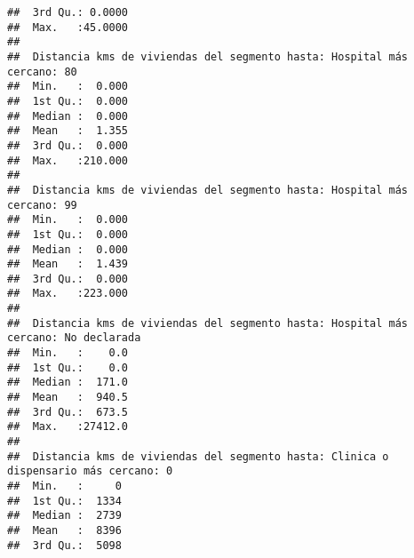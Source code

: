 \documentclass[11pt,]{article}
\begin{document}
\begin{verbatim}
##  3rd Qu.: 0.0000                                                        
##  Max.   :45.0000                                                        
##                                                                         
##  Distancia kms de viviendas del segmento hasta: Hospital más cercano: 80
##  Min.   :  0.000                                                        
##  1st Qu.:  0.000                                                        
##  Median :  0.000                                                        
##  Mean   :  1.355                                                        
##  3rd Qu.:  0.000                                                        
##  Max.   :210.000                                                        
##                                                                         
##  Distancia kms de viviendas del segmento hasta: Hospital más cercano: 99
##  Min.   :  0.000                                                        
##  1st Qu.:  0.000                                                        
##  Median :  0.000                                                        
##  Mean   :  1.439                                                        
##  3rd Qu.:  0.000                                                        
##  Max.   :223.000                                                        
##                                                                         
##  Distancia kms de viviendas del segmento hasta: Hospital más cercano: No declarada
##  Min.   :    0.0                                                                  
##  1st Qu.:    0.0                                                                  
##  Median :  171.0                                                                  
##  Mean   :  940.5                                                                  
##  3rd Qu.:  673.5                                                                  
##  Max.   :27412.0                                                                  
##                                                                                   
##  Distancia kms de viviendas del segmento hasta: Clinica o dispensario más cercano: 0
##  Min.   :     0                                                                     
##  1st Qu.:  1334                                                                     
##  Median :  2739                                                                     
##  Mean   :  8396                                                                     
##  3rd Qu.:  5098                                                                     

\end{verbatim}
\end{document}
